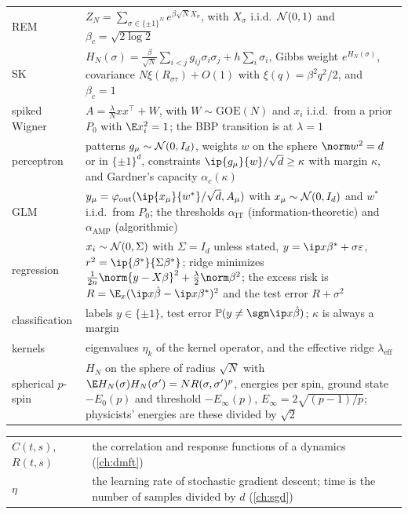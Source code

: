 \begin{tabular}{@{}p{}p{}@{}}
REM & $Z_N=\sum_{\sigma\in\{\pm1\}^N}e^{\beta\sqrt N X_\sigma}$, with $X_\sigma$ i.i.d.\ $\mathcal{N}(0,1)$ and $\beta_c=\sqrt{2\log2}$ \\
SK & $H_N(\sigma)=\frac{\beta}{\sqrt N}\sum_{i<j}g_{ij}\sigma_i\sigma_j+h\sum_i\sigma_i$, Gibbs weight $e^{H_N(\sigma)}$, covariance $N\xi(R_{\sigma\tau})+O(1)$ with $\xi(q)=\beta^2q^2/2$, and $\beta_c=1$ \\
spiked Wigner & $A=\frac\lambda N xx^\top+W$, with $W\sim\mathrm{GOE}(N)$ and $x_i$ i.i.d.\ from a prior $P_0$ with $\E x_i^2=1$; the BBP transition is at $\lambda=1$ \\
perceptron & patterns $g_\mu\sim\mathcal{N}(0,I_d)$, weights $w$ on the sphere $\norm w^2=d$ or in $\{\pm1\}^d$, constraints $\ip{g_\mu}{w}/\sqrt d\ge\kappa$ with margin $\kappa$, and Gardner's capacity $\alpha_c(\kappa)$ \\
GLM & $y_\mu=\varphi_{\mathrm{out}}(\ip{x_\mu}{w^*}/\sqrt d,A_\mu)$ with $x_\mu\sim\mathcal{N}(0,I_d)$ and $w^*$ i.i.d.\ from $P_0$; the thresholds $\alpha_{\mathrm{IT}}$ (information-theoretic) and $\alpha_{\mathrm{AMP}}$ (algorithmic) \\
regression & $x_i\sim\mathcal{N}(0,\Sigma)$ with $\Sigma=I_d$ unless stated, $y=\ip x{\beta^*}+\sigma\varepsilon$, $r^2=\ip{\beta^*}{\Sigma\beta^*}$; ridge minimizes $\frac1{2n}\norm{y-X\beta}^2+\frac\lambda2\norm\beta^2$; the excess risk is $R=\E_x(\ip x{\hat\beta}-\ip x{\beta^*})^2$ and the test error $R+\sigma^2$ \\
classification & labels $y\in\{\pm1\}$, test error $\Prob(y\ne\sgn\ip x{\hat\beta})$; $\kappa$ is always a margin \\
kernels & eigenvalues $\eta_k$ of the kernel operator, and the effective ridge $\lambda_{\mathrm{eff}}$ \\
spherical $p$-spin & $H_N$ on the sphere of radius $\sqrt N$ with $\E H_N(\sigma)H_N(\sigma')=N R(\sigma,\sigma')^p$, energies per spin, ground state $-E_0(p)$ and threshold $-E_\infty(p)$, $E_\infty=2\sqrt{(p-1)/p}$; physicists' energies are these divided by $\sqrt2$
\end{tabular}


\begin{tabular}{@{}p{}p{}@{}}
$C(t,s)$, $R(t,s)$ & the correlation and response functions of a dynamics (\cref{ch:dmft}) \\
$\eta$ & the learning rate of stochastic gradient descent; time is the number of samples divided by $d$ (\cref{ch:sgd})
\end{tabular}

